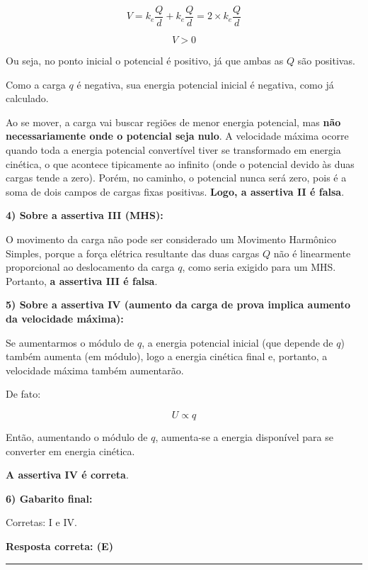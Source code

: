 \documentclass[a4paper,12pt]{article}
\begin{document}
\begin{flushleft}
\[
V = k_e \frac{Q}{d} + k_e \frac{Q}{d} = 2 \times k_e \frac{Q}{d}
\]

\[
V > 0
\]

Ou seja, no ponto inicial o potencial é positivo, já que ambas as \( Q \) são positivas.

Como a carga \( q \) é negativa, sua energia potencial inicial é negativa, como já calculado.

Ao se mover, a carga vai buscar regiões de menor energia potencial, mas \textbf{não necessariamente onde o potencial seja nulo}. A velocidade máxima ocorre quando toda a energia potencial convertível tiver se transformado em energia cinética, o que acontece tipicamente ao infinito (onde o potencial devido às duas cargas tende a zero). Porém, no caminho, o potencial nunca será zero, pois é a soma de dois campos de cargas fixas positivas. \textbf{Logo, a assertiva II é falsa}.

\textbf{4) Sobre a assertiva III (MHS):}

O movimento da carga não pode ser considerado um Movimento Harmônico Simples, porque a força elétrica resultante das duas cargas \( Q \) não é linearmente proporcional ao deslocamento da carga \( q \), como seria exigido para um MHS. Portanto, \textbf{a assertiva III é falsa}.

\textbf{5) Sobre a assertiva IV (aumento da carga de prova implica aumento da velocidade máxima):}

Se aumentarmos o módulo de \( q \), a energia potencial inicial (que depende de \( q \)) também aumenta (em módulo), logo a energia cinética final e, portanto, a velocidade máxima também aumentarão.

De fato:

\[
U \propto q
\]

Então, aumentando o módulo de \( q \), aumenta-se a energia disponível para se converter em energia cinética.

\textbf{A assertiva IV é correta}.

\textbf{6) Gabarito final:}

Corretas: I e IV.

\textbf{Resposta correta: \colorbox{green!50}{(E)}}

\end{flushleft}
\noindent\rule{\linewidth}{0.6pt}\\
\end{document}
